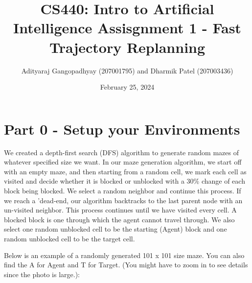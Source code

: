\documentclass[10pt]{article}
\title{CS440: Intro to Artificial Intelligence Assisgnment 1 - 
 Fast Trajectory Replanning }
\author{Adityaraj Gangopadhyay (207001795) and Dharmik Patel (207003436)}
\date{February 25, 2024}
\begin{document}
\maketitle


\section*{Part 0 - Setup your Environments}
We created a depth-first search (DFS) algorithm to generate random mazes of whatever specified size we want. In our maze generation algorithm, we start off with an empty maze, and then starting from a random cell, we mark each cell as visited and decide whether it is blocked or unblocked with a 30\% change of each block being blocked. We select a random neighbor and continue this process. If we reach a 'dead-end, our algorithm backtracks to the last parent node with an un-visited neighbor. This process continues until we have visited every cell. A blocked block is one through which the agent cannot travel through. We also select one random unblocked cell to be the starting (Agent) block and one random unblocked cell to be the target cell.

Below is an example of a randomly generated 101 x 101 size maze. You can also find the A for Agent and T for Target. (You might have to zoom in to see details since the photo is large.):
\end{document}
